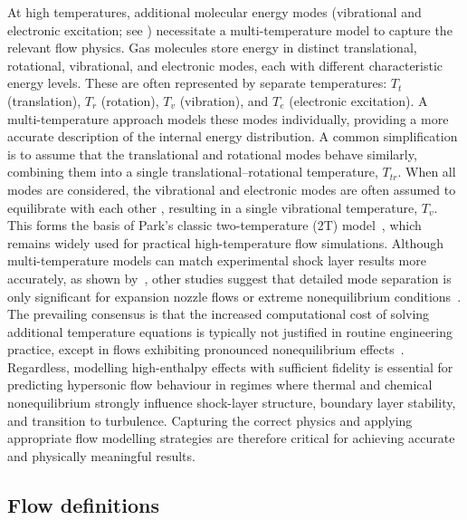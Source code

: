 At high temperatures, additional molecular energy modes (vibrational and electronic excitation; see ) necessitate a multi-temperature model to capture the relevant flow physics. Gas molecules store energy in distinct translational, rotational, vibrational, and electronic modes, each with different characteristic energy levels. These are often represented by separate temperatures: $T_t$ (translation), $T_r$ (rotation), $T_v$ (vibration), and $T_e$ (electronic excitation). A multi-temperature approach models these modes individually, providing a more accurate description of the internal energy distribution. A common simplification is to assume that the translational and rotational modes behave similarly, combining them into a single translational–rotational temperature, $T_{tr}$. When all modes are considered, the vibrational and electronic modes are often assumed to equilibrate with each other \citep{Bertin2006}, resulting in a single vibrational temperature, $T_v$. This forms the basis of Park’s classic two-temperature (2T) model~\citep{Park1990}, which remains widely used for practical high-temperature flow simulations. Although multi-temperature models can match experimental shock layer results more accurately, as shown by~\citet{Gulhan2018}, other studies suggest that detailed mode separation is only significant for expansion nozzle flows or extreme nonequilibrium conditions~\citep{ParkLee1995}. The prevailing consensus is that the increased computational cost of solving additional temperature equations is typically not justified in routine engineering practice, except in flows exhibiting pronounced nonequilibrium effects~\citep{Nagnibeda2009}.
Regardless, modelling high-enthalpy effects with sufficient fidelity is essential for predicting hypersonic flow behaviour in regimes where thermal and chemical nonequilibrium strongly influence shock-layer structure, boundary layer stability, and transition to turbulence. Capturing the correct physics and applying appropriate flow modelling strategies are therefore critical for achieving accurate and physically meaningful results.

\subsection{Flow definitions}

